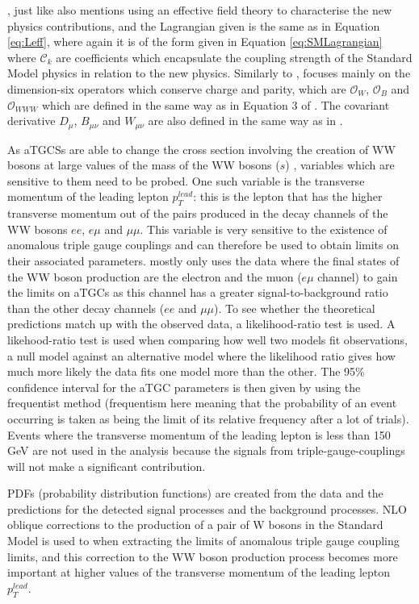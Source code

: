 \documentclass[11pt,oneside,a4paper]{article}
\begin{document}
\cite{WWtgc}, just like \cite{higgsdata} also mentions using an effective field theory to characterise the new physics contributions, and the Lagrangian given is the same as in Equation \ref{eq:Leff}, where again it is of the form given in Equation \ref{eq:SMLagrangian} where $\mathcal{C}_{k}$ are coefficients which encapsulate the coupling strength of the Standard Model physics in relation to the new physics. Similarly to \cite{higgsdata}, \cite{WWtgc} focuses mainly on the dimension-six operators which conserve charge and parity, which are $\mathcal{O}_W$, $\mathcal{O}_B$ and $\mathcal{O}_{WWW}$ which are defined in the same way as in Equation 3 of \cite{higgsdata}. The covariant derivative $D_{\mu}$, $B_{\mu\nu}$ and $W_{\mu\nu}$ are also defined in the same way as in \cite{higgsdata}.


As aTGCSs are able to change the cross section involving the creation of WW bosons at large values of the mass of the WW bosons ($\hat{s}$) , variables which are sensitive to them need to be probed. One such variable is the transverse momentum of the leading lepton $p^{lead}_{T}$: this is the lepton that has the higher transverse momentum out of the pairs produced in the decay channels of the WW bosons $ee$, $e\mu$ and $\mu\mu$. This variable is very sensitive to the existence of anomalous triple gauge couplings and can therefore be used to obtain limits on their associated parameters. \cite{WWtgc} mostly only uses the data where the final states of the WW boson production are the electron and the muon ($e\mu$ channel) to gain the limits on aTGCs as this channel has a greater signal-to-background ratio than the other decay channels ($ee$ and $\mu\mu$). To see whether the theoretical predictions match up with the observed data, a likelihood-ratio test is used. A likehood-ratio test is used when comparing how well two models fit observations, a null model against an alternative model where the likelihood ratio gives how much more likely the data fits one model more than the other. The 95\% confidence interval for the aTGC parameters is then given by using the frequentist method (frequentism here meaning that the probability of an event occurring is taken as being the limit of its relative frequency after a lot of trials). Events where the transverse momentum of the leading lepton is less than 150 GeV are not used in the analysis because the signals from triple-gauge-couplings will not make a significant contribution.

PDFs (probability distribution functions) are created from the data and the predictions for the detected signal processes and the background processes. NLO oblique corrections to the production of a pair of W bosons in the Standard Model is used to when extracting the limits of anomalous triple gauge coupling limits, and this correction to the WW boson production process becomes more important at higher values of the transverse momentum of the leading lepton $p^{lead}_{T}$. 
\end{document}

